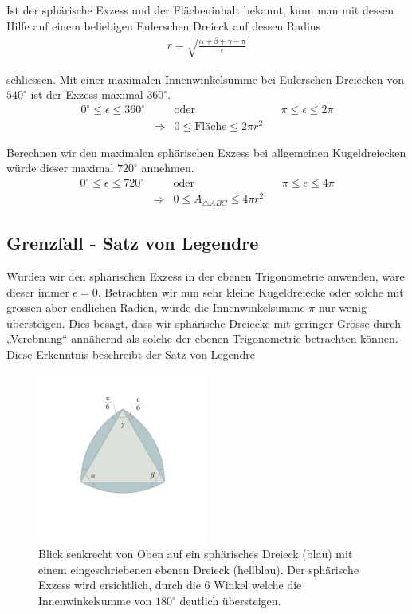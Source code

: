\begin{refsection}
Ist der sphärische Exzess und der Flächeninhalt bekannt, kann man mit dessen Hilfe auf einem beliebigen Eulerschen Dreieck auf dessen Radius
\begin{align*}
r = \sqrt{\frac{\alpha + \beta + \gamma - \pi}{\epsilon}}
\end{align*}

schliessen. Mit einer maximalen Innenwinkelsumme bei Eulerschen Dreiecken von $540^{\circ}$ ist der Exzess maximal $360^{\circ}$.
\[
\begin{aligned}
0^{\circ} \le \epsilon \le 360^{\circ}
&
&\text{oder}
&
&\pi \le \epsilon \le 2\pi \\
&\Rightarrow
& 0 \le \text{Fläche} \le 2 \pi r^2
\end{aligned}
\]

Berechnen wir den maximalen sphärischen Exzess bei allgemeinen Kugeldreiecken würde dieser maximal $720^{\circ}$ annehmen.
\[
\begin{aligned}
0^{\circ} \le \epsilon \le 720^{\circ}
&
&\text{oder}
&
&\pi \le \epsilon \le 4\pi \\
&\Rightarrow
& 0 \le A_{\triangle{ ABC }} \le 4 \pi r^2
\end{aligned}
\]



\subsection{Grenzfall - Satz von Legendre}
Würden wir den sphärischen Exzess in der ebenen Trigonometrie anwenden, wäre dieser immer $\epsilon=0$. Betrachten wir nun sehr kleine Kugeldreiecke oder solche mit grossen aber endlichen Radien, würde die Innenwinkelsumme $\pi$ nur wenig übersteigen. Dies besagt, dass wir sphärische Dreiecke mit geringer Grösse durch „Verebnung“ annähernd als solche der ebenen Trigonometrie betrachten können. Diese Erkenntnis beschreibt der Satz von Legendre

\begin{figure}[htbp]
\centering
\includegraphics[width=0.5\textwidth]{kugel/SphaerischerExzess.jpg}
\caption{Blick senkrecht von Oben auf ein sphärisches Dreieck (blau) mit einem eingeschriebenen ebenen Dreieck (hellblau). Der sphärische Exzess wird ersichtlich, durch die 6 Winkel welche die Innenwinkelsumme von $180^{\circ}$ deutlich übersteigen.}
\end{figure}



\end{refsection}
